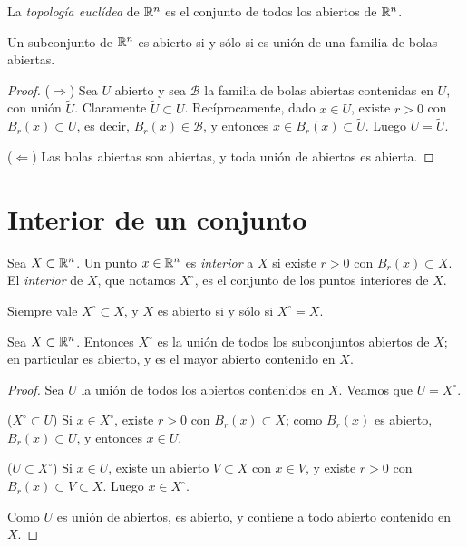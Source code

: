 \begin{definition}
  La \emph{topología euclídea} de \(\mathbb{R}^n\) es el conjunto de todos los abiertos de \(\mathbb{R}^n\).
\end{definition}

\begin{corollary}
  Un subconjunto de \(\mathbb{R}^n\) es abierto si y sólo si es unión de una familia de bolas abiertas.
\end{corollary}

\begin{proof}
  (\(\Rightarrow\)) Sea \(U\) abierto y sea \(\mathscr{B}\) la familia de bolas abiertas contenidas en \(U\), con unión \(\tilde{U}\). Claramente \(\tilde{U} \subset U\). Recíprocamente, dado \(x \in U\), existe \(r > 0\) con \(B_r(x) \subset U\), es decir, \(B_r(x) \in \mathscr{B}\), y entonces \(x \in B_r(x) \subset \tilde{U}\). Luego \(U = \tilde{U}\).

  (\(\Leftarrow\)) Las bolas abiertas son abiertas, y toda unión de abiertos es abierta.
\end{proof}

\section{Interior de un conjunto}

\begin{definition}[Interior]
  Sea \(X \subset \mathbb{R}^n\). Un punto \(x \in \mathbb{R}^n\) es \emph{interior} a \(X\) si existe \(r > 0\) con \(B_r(x) \subset X\). El \emph{interior} de \(X\), que notamos \(X^{\circ}\), es el conjunto de los puntos interiores de \(X\).
\end{definition}

\begin{note}
  Siempre vale \(X^{\circ} \subset X\), y \(X\) es abierto si y sólo si \(X^{\circ} = X\).
\end{note}

\begin{prop}
  Sea \(X \subset \mathbb{R}^n\). Entonces \(X^{\circ}\) es la unión de todos los subconjuntos abiertos de \(X\); en particular es abierto, y es el mayor abierto contenido en \(X\).
\end{prop}

\begin{proof}
  Sea \(U\) la unión de todos los abiertos contenidos en \(X\). Veamos que \(U = X^{\circ}\).

  (\(X^{\circ} \subset U\)) Si \(x \in X^{\circ}\), existe \(r > 0\) con \(B_r(x) \subset X\); como \(B_r(x)\) es abierto, \(B_r(x) \subset U\), y entonces \(x \in U\).

  (\(U \subset X^{\circ}\)) Si \(x \in U\), existe un abierto \(V \subset X\) con \(x \in V\), y existe \(r > 0\) con \(B_r(x) \subset V \subset X\). Luego \(x \in X^{\circ}\).

  Como \(U\) es unión de abiertos, es abierto, y contiene a todo abierto contenido en \(X\).
\end{proof}

